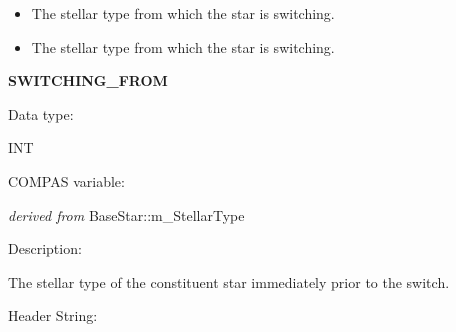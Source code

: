 \begin{itemize}
    \item{The stellar type from which the star is switching.}
    \item{The stellar type from which the star is switching.}
\end{itemize}

\medskip
\begin{minipage}{\textwidth} %
    \textbf{SWITCHING\_FROM} \\
    \parskip 0pt
    \begin{minipage}[t][][b]{8.25em}Data type:\end{minipage}
    \begin{minipage}[t][][b]{\dimexpr\textwidth-8.75em}INT\end{minipage}\vfill
    \begin{minipage}[t][][b]{8.25em}COMPAS variable:\end{minipage}
    \begin{minipage}[t][][b]{\dimexpr\textwidth-8.75em}\textit{derived from }BaseStar::m\_StellarType\end{minipage}\vfill
    \begin{minipage}[t][][b]{8.25em}Description:\end{minipage}
    \begin{minipage}[t][][b]{\dimexpr\textwidth-8.75em}\raggedright{The stellar type of the constituent star immediately prior to the switch.}\end{minipage}\vfill
    \begin{minipage}[t][][b]{8.25em}Header String:\end{minipage}
    \begin{minipage}[t][][b]{\dimexpr\textwidth-8.75em}\raggedright{}\end{minipage}\vfill
\end{minipage}

